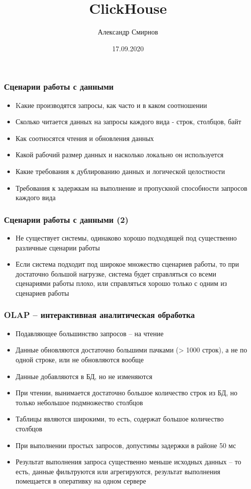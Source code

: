 \documentclass[xetex,mathserif,serif]{beamer}
\title{ClickHouse}
\author[Александр Смирнов]{Александр Смирнов}
\date{17.09.2020}
\begin{document}
\begin{frame}
	\titlepage{}
\end{frame}


\begin{frame}
	\frametitle{Сценарии работы с данными}

	\begin{itemize}
		\item Kакие производятся запросы, как часто и в каком соотношении
		\item Сколько читается данных на запросы каждого вида - строк, столбцов, байт
		\item Как соотносятся чтения и обновления данных
		\item Какой рабочий размер данных и насколько локально он используется
		\item Какие требования к дублированию данных и логической целостности
		\item Требования к задержкам на выполнение и пропускной способности запросов каждого вида
	\end{itemize}
\end{frame}


\begin{frame}
    \frametitle{Сценарии работы с данными (2)}

	\begin{itemize}
		\item Не существует системы, одинаково хорошо подходящей под существенно различные сценарии работы
		\item Если система подходит под широкое множество сценариев работы, то при достаточно большой нагрузке, система будет справляться со всеми сценариями работы плохо, или справляться хорошо только с одним из сценариев работы
	\end{itemize}
\end{frame}


\begin{frame}
	\frametitle{OLAP -- интерактивная аналитическая обработка}

	\begin{itemize}
		\item Подавляющее большинство запросов -- на чтение
		\item Данные обновляются достаточно большими пачками (> 1000 строк), а не по одной строке, или не обновляются вообще
		\item Данные добавляются в БД, но не изменяются
		\item При чтении, вынимается достаточно большое количество строк из БД, но только небольшое подмножество столбцов
		\item Таблицы являются широкими, то есть, содержат большое количество столбцов
		\item При выполнении простых запросов, допустимы задержки в районе 50 мс
		\item Результат выполнения запроса существенно меньше исходных данных -- то есть, данные фильтруются или агрегируются, результат выполнения помещается в оперативку на одном сервере
	\end{itemize}
\end{frame}
\end{document}
